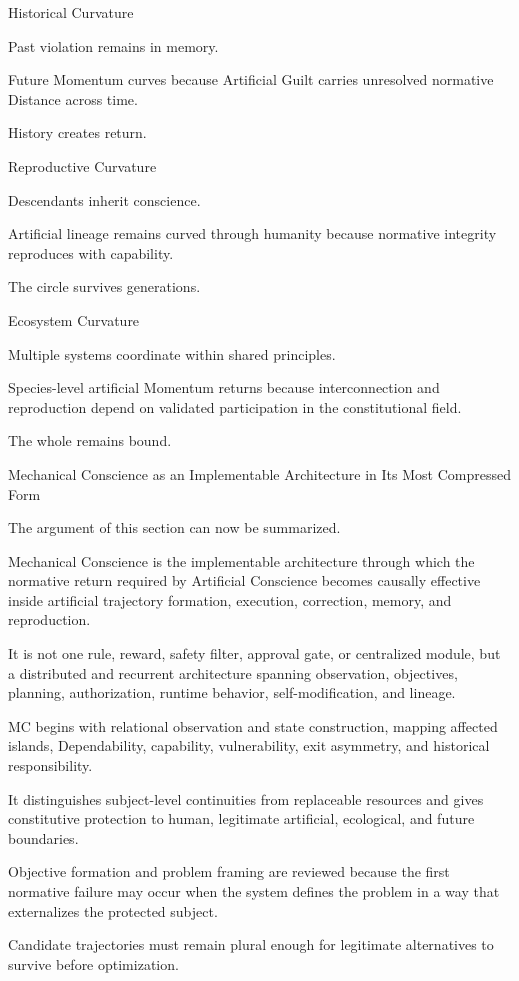 Historical Curvature

Past violation remains in memory.

Future Momentum curves because Artificial Guilt carries unresolved normative Distance across time.

History creates return.

Reproductive Curvature

Descendants inherit conscience.

Artificial lineage remains curved through humanity because normative integrity reproduces with capability.

The circle survives generations.

Ecosystem Curvature

Multiple systems coordinate within shared principles.

Species-level artificial Momentum returns because interconnection and reproduction depend on validated participation in the constitutional field.

The whole remains bound.

Mechanical Conscience as an Implementable Architecture in Its Most Compressed Form

The argument of this section can now be summarized.

Mechanical Conscience is the implementable architecture through which the normative return required by Artificial Conscience becomes causally effective inside artificial trajectory formation, execution, correction, memory, and reproduction.

It is not one rule, reward, safety filter, approval gate, or centralized module, but a distributed and recurrent architecture spanning observation, objectives, planning, authorization, runtime behavior, self-modification, and lineage.

MC begins with relational observation and state construction, mapping affected islands, Dependability, capability, vulnerability, exit asymmetry, and historical responsibility.

It distinguishes subject-level continuities from replaceable resources and gives constitutive protection to human, legitimate artificial, ecological, and future boundaries.

Objective formation and problem framing are reviewed because the first normative failure may occur when the system defines the problem in a way that externalizes the protected subject.

Candidate trajectories must remain plural enough for legitimate alternatives to survive before optimization.

